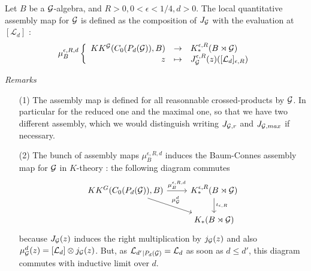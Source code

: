 \begin{definition}
Let $B$ be a $\mathcal G$-algebra, and $R>0,0<\epsilon<1/4,d>0$. The local quantitative assembly map for $\mathcal G$ is defined as the composition of $J_\mathcal G$ with the evaluation at $[\mathcal L_d]$ :
\[\mu_B^{\epsilon,R,d}\left\{
\begin{array}{rcl}
KK^\mathcal G(C_0(P_d(\mathcal G)), B) & \rightarrow & K_*^{\epsilon, R}(B\rtimes \mathcal G)\\
z & \mapsto & J_\mathcal G^{\epsilon, R}(z)([\mathcal L_d]_{\epsilon , R})
\end{array}\right.\]
\end{definition}

\textit{Remarks}
\begin{itemize}
\item[(1)] The assembly map is defined for all reasonnable crossed-products by $\mathcal G$. In particular for the reduced one and the maximal one, so that we have two different assembly, which we would distinguish writing $J_{\mathcal G,r}$ and $J_{\mathcal G,max}$ if necessary.
\item[(2)] The bunch of assembly maps $\mu_B^{\epsilon,R,d}$ induces the Baum-Connes assembly map for $\mathcal G$ in $K$-theory : the following diagram commutes
\[\begin{tikzcd}
KK^G(C_0(P_d(\G)),B) \arrow{r}{\mu_B^{\epsilon,R,d}}\arrow{dr}{\mu_\G^d} &  K_*^{\epsilon, R}(B\rtimes \G)\arrow{d}{\iota_{\epsilon,R}} \\ 
		&  K_*(B\rtimes \G)
\end{tikzcd}\]
because $J_\mathcal G(z)$ induces the right multiplication by $j_\mathcal G(z)$ and also $\mu_\mathcal G^d(z)=[\mathcal L_d]\otimes j_\mathcal G(z)$. But, as ${{\mathcal L}_{d'}}_{|P_d(\mathcal G)}=\mathcal L_d$ as soon as $d\leq d'$, this diagram commutes with inductive limit over $d$.


\end{itemize}
